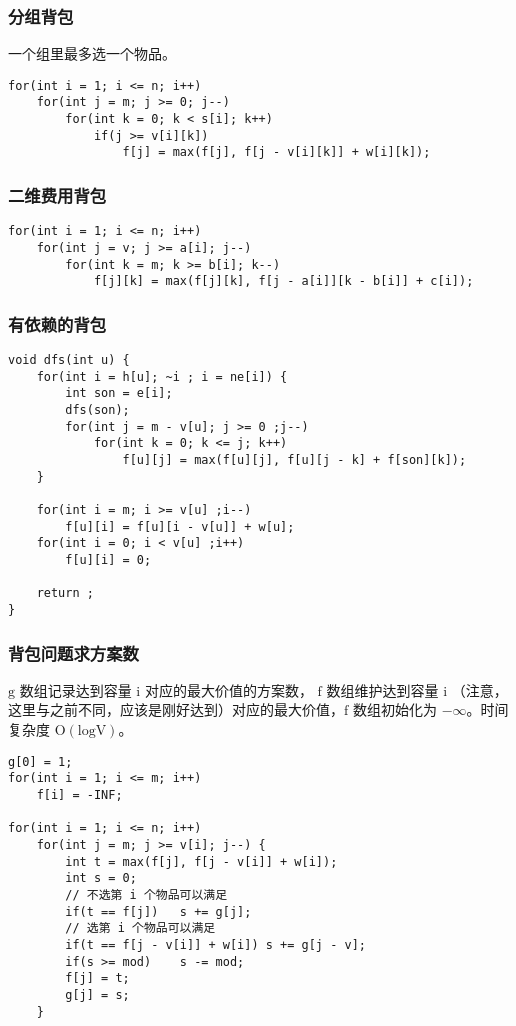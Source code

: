 \documentclass[UTF8]{article}
\begin{document}
\subsubsection{分组背包}
一个组里最多选一个物品。
\begin{lstlisting}[caption=分组背包]
for(int i = 1; i <= n; i++)
	for(int j = m; j >= 0; j--)
		for(int k = 0; k < s[i]; k++)
			if(j >= v[i][k])
				f[j] = max(f[j], f[j - v[i][k]] + w[i][k]);
\end{lstlisting}


\subsubsection{二维费用背包}
\begin{lstlisting}[caption=二维费用背包]
for(int i = 1; i <= n; i++) 
	for(int j = v; j >= a[i]; j--)
		for(int k = m; k >= b[i]; k--)
			f[j][k] = max(f[j][k], f[j - a[i]][k - b[i]] + c[i]);
\end{lstlisting}


\subsubsection{有依赖的背包}
\begin{lstlisting}[caption=有依赖的背包]
void dfs(int u) {
	for(int i = h[u]; ~i ; i = ne[i]) {
		int son = e[i];
		dfs(son);
		for(int j = m - v[u]; j >= 0 ;j--)
			for(int k = 0; k <= j; k++)
				f[u][j] = max(f[u][j], f[u][j - k] + f[son][k]);
	}
    
	for(int i = m; i >= v[u] ;i--)
		f[u][i] = f[u][i - v[u]] + w[u];
	for(int i = 0; i < v[u] ;i++)
		f[u][i] = 0;
    
	return ;
}
\end{lstlisting}


\subsubsection{背包问题求方案数}
$\mathrm{g}$ 数组记录达到容量 $\mathrm{i}$ 对应的最大价值的方案数， $\mathrm{f}$ 数组维护达到容量 $\mathrm{i}$ （注意，这里与之前不同，应该是刚好达到）对应的最大价值，$\mathrm{f}$ 数组初始化为 $\mathrm{-\infty}$。时间复杂度 $\mathrm{O(logV)}$。
\begin{lstlisting}[caption=背包问题求方案数]
g[0] = 1;
for(int i = 1; i <= m; i++)
	f[i] = -INF;

for(int i = 1; i <= n; i++)
	for(int j = m; j >= v[i]; j--) {
		int t = max(f[j], f[j - v[i]] + w[i]);
		int s = 0;
		// 不选第 i 个物品可以满足
		if(t == f[j])	s += g[j];
		// 选第 i 个物品可以满足
		if(t == f[j - v[i]] + w[i])	s += g[j - v];
		if(s >= mod)	s -= mod;
		f[j] = t;
		g[j] = s;
	}
\end{lstlisting}
\end{document}

